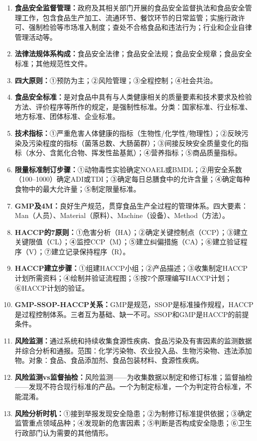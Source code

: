 {\begin{enumerate}[leftmargin=*, itemsep=6pt]
    \item \textbf{食品安全监督管理：}政府及其相关部门开展的食品安全监督执法和食品安全管理工作，包含食品生产加工、流通环节、餐饮环节的日常监管；实施行政许可、强制检验等市场准入制度；查处不合格食品和违法行为；行业和企业自律管理活动等。
    \item \textbf{法律法规体系构成：}食品安全法律；食品安全法规；食品安全规章；食品安全标准；其他规范性文件。
    \item \textbf{四大原则：}①预防为主；②风险管理；③全程控制；④社会共治。
    \item \textbf{食品安全标准：}是对食品中具有与人类健康相关的质量要素和技术要求及检验方法、评价程序等所作的规定，是强制性标准。分类：国家标准、行业标准、地方标准、团体标准、企业标准。
    \item \textbf{技术指标：}①严重危害人体健康的指标（生物性/化学性/物理性）；②反映污染及污染程度的指标（菌落总数、大肠菌群）；③间接反映安全质量变化的指标（水分、含氮化合物、挥发性盐基氮）；④营养指标；⑤商品质量指标。
    \item \textbf{限量标准制订步骤：}①动物毒性实验确定NOAEL或BMDL；②用安全系数（100--1000）确定ADI或TDI；③确定每日总膳食中的允许含量；④确定每种食物中的最大允许量；⑤制定限量标准。
    \item \textbf{GMP及4M：}良好生产规范，贯穿食品生产全过程的管理体系。四大要素：Man（人员）、Material（原料）、Machine（设备）、Method（方法）。
    \item \textbf{HACCP的7原则：}①危害分析（HA）；②确定关键控制点（CCP）；③建立关键限值（CL）；④监控CCP（M）；⑤建立纠偏措施（CA）；⑥建立验证程序（V）；⑦建立记录保持程序（R）。
    \item \textbf{HACCP建立步骤：}①组建HACCP小组；②产品描述；③收集制定HACCP计划所需资料；④绘制并验证流程图；⑤按7个原理编写HACCP计划；⑥HACCP计划的验证。
    \item \textbf{GMP-SSOP-HACCP关系：}GMP是规范，SSOP是标准操作规程，HACCP是过程控制体系。三者互为基础、缺一不可。SSOP和GMP是HACCP的前提条件。
    \item \textbf{风险监测：}通过系统和持续收集食源性疾病、食品污染及有害因素的监测数据并综合分析和通报。范围：化学污染物、农业投入品、生物污染物、违法添加物。对象：食品、食品添加剂、食品包装材料、食源性疾病。
    \item \textbf{风险监测vs监督抽检：}风险监测——为收集数据以制定和修订标准；监督抽检——发现不符合现行标准的产品。一个为制定标准，一个为判定符合标准，不能混淆。
    \item \textbf{风险分析时机：}①接到举报发现安全隐患；②为制修订标准提供依据；③确定监管重点领域品种；④发现新的危害因素；⑤判断是否构成安全隐患；⑥卫生行政部门认为需要的其他情形。

\end{enumerate}}
